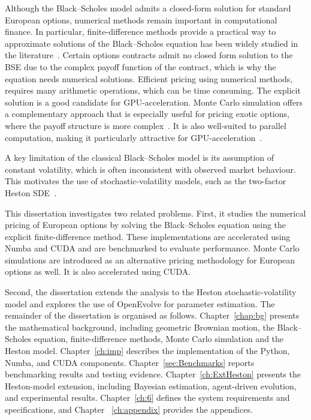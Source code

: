 \documentclass[11pt]{report}
\begin{document}
Although the Black--Scholes model admits a 
closed-form solution for standard European options, 
numerical methods remain important in computational 
finance. In particular, finite-difference methods provide 
a practical way to approximate solutions of the 
Black--Scholes equation has been widely studied 
in the literature~\cite{414b2dca-3879-3269-bb3d-fa223d68ead3,math8030391,5523590}. 
Certain options contracts admit no closed form solution
to the BSE due to the complex payoff function of the 
contract, which is why the equation needs numerical solutions.
Efficient pricing using numerical methods, 
requires many arithmetic operations, 
which can be time consuming. The explicit solution is
a good candidate for GPU-acceleration.  
Monte Carlo simulation offers a complementary 
approach that is especially useful for pricing 
exotic options, where the payoff structure 
is more complex~\cite{GOBET2009497,xu2014highperformancefinancialsimulation}. 
It is also well-suited to parallel computation, 
making it particularly attractive 
for GPU-acceleration~\cite{BOYLE197732,cpe2862}.

A key limitation of the classical Black--Scholes model 
is its assumption of constant volatility, which is often 
inconsistent with observed market behaviour. This motivates
the use of stochastic-volatility models, such as the 
two-factor Heston SDE~\cite{heston2015}.

This dissertation investigates two related problems.
First, it studies the numerical pricing of 
European options by solving the Black--Scholes 
equation using the explicit finite-difference 
method. These implementations 
are accelerated using Numba and CUDA and are benchmarked 
to evaluate performance. Monte Carlo simulations
are introduced as an alternative pricing methodology
for European options as well. It is also accelerated using
CUDA.

Second, the dissertation extends 
the analysis to the Heston stochastic-volatility model 
and explores the use of OpenEvolve for parameter estimation. 
The remainder of the
dissertation is organised as follows. Chapter~\ref{chap:bg} presents the 
mathematical background, including geometric Brownian motion, 
the Black--Scholes equation, finite-difference methods, 
Monte Carlo simulation and the Heston model. 
Chapter~\ref{ch:imp} describes the implementation of the Python, Numba,
and CUDA components. 
Chapter~\ref{sec:Benchmarks} reports benchmarking results and testing evidence. 
Chapter~\ref{ch:ExtHeston} presents the Heston-model extension, including
Bayesian estimation, agent-driven evolution, and experimental results. 
Chapter~\ref{ch:6} defines the system requirements and specifications, and Chapter
~\ref{ch:appendix} provides the appendices.
\end{document}
